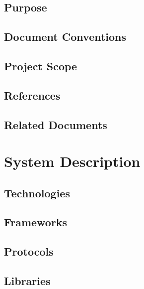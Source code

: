 \documentclass[12pt]{article}
\begin{document}
	\subsection{Purpose}


	\subsection{Document Conventions}


	\subsection{Project Scope}


	\subsection{References}


	\subsection{Related Documents}



\section{System Description}

	\subsection{Technologies}
	
	
	\subsection{Frameworks}
	
	
	\subsection{Protocols}
	
	
	\subsection{Libraries}


\end{document}
